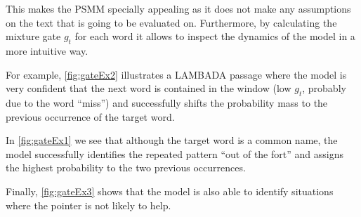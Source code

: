 This makes the PSMM specially appealing as it does not make any assumptions on the text that is going to be evaluated on. Furthermore, by calculating the mixture gate $g_t$ for each word it allows to inspect the dynamics of the model in a more intuitive way. 

For example, \autoref{fig:gateEx2} illustrates a LAMBADA passage where the model is very confident that the next word is contained in the window (low $g_t$, probably due to the word ``miss'') and successfully shifts the probability mass to the previous occurrence of the target word.

\begin{figure}[H]
	\centering
	\label{fig:gateEx2}
\end{figure}

In \autoref{fig:gateEx1} we see that although the target word is a common name, the model successfully identifies the repeated pattern ``out of the fort'' and assigns the highest probability to the two previous occurrences.

\begin{figure}[H]
	\centering
	\label{fig:gateEx1}
\end{figure}

Finally, \autoref{fig:gateEx3} shows that the model is also able to identify situations where the pointer is not likely to help.

\begin{figure}[H]
	\centering
	\label{fig:gateEx3}
\end{figure}